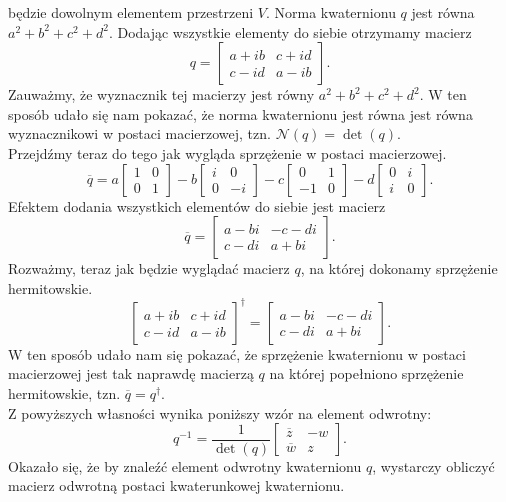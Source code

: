 \documentclass[a4paper,twoside,11pt,reqno]{mwrep}
\theoremstyle{plain} \newtheorem{twr}{Twierdzenie}
\theoremstyle{plain} \newtheorem{lem}{Lemat}
\theoremstyle{definition} \newtheorem{defi}{Definicja}
\theoremstyle{remark} \newtheorem*{wni}{Wniosek}
\theoremstyle{definition} \newtheorem{uwaga}{Uwaga}
\theoremstyle{definition}\newtheorem{prz}{Przykład}
\begin{document}
będzie dowolnym elementem przestrzeni $V$.
Norma kwaternionu $q$ jest równa $a^2+b^2+c^2+d^2$. Dodając wszystkie elementy do siebie 
otrzymamy macierz 
$$q=\begin{bmatrix}
	a+ib&c+id\\
	c-id& a-ib
\end{bmatrix}.$$
Zauważmy, że wyznacznik tej macierzy jest równy $a^2+b^2+c^2+d^2$. W ten sposób udało
się nam pokazać, że norma kwaternionu jest równa jest równa wyznacznikowi w postaci 
macierzowej, tzn. $\mathcal{N}(q) = \det(q)$.\\
\indent
Przejdźmy teraz do tego jak wygląda sprzężenie w postaci macierzowej.
$$ \overline{q}=a\begin{bmatrix}
	1&0\\
	0& 1
\end{bmatrix}-
b\begin{bmatrix}
	i&0\\
	0& -i
\end{bmatrix}-
c\begin{bmatrix}
	0&1\\
	-1& 0
\end{bmatrix}-
d\begin{bmatrix}
	0&i\\
	i& 0
\end{bmatrix}.$$
Efektem dodania wszystkich elementów do siebie jest macierz
$$\overline{q}=\begin{bmatrix}
	a-bi&-c-di\\
	c-di& a+bi
\end{bmatrix}.$$
Rozważmy, teraz jak będzie wyglądać macierz $q$, na której dokonamy sprzężenie hermitowskie.
$$\begin{bmatrix}
	a+ib&c+id\\
	c-id& a-ib
\end{bmatrix}^\dagger=\begin{bmatrix}
	a-bi&-c-di\\
	c-di& a+bi
\end{bmatrix}.$$
W ten sposób udało nam się pokazać, że sprzężenie kwaternionu w postaci macierzowej 
jest tak naprawdę macierzą $q$ na której popełniono sprzężenie hermitowskie, tzn.
$\overline{q} = q^\dagger$.\\
\indent
Z powyższych własności wynika poniższy wzór na element odwrotny:
$$q^{-1} = \frac{1}{\det(q)}\begin{bmatrix}
	\overline{z}&-w\\
	\overline{w}& z
\end{bmatrix}.$$
Okazało się, że by znaleźć element odwrotny kwaternionu $q$, wystarczy obliczyć macierz odwrotną postaci kwaterunkowej kwaternionu. 
\end{document}
